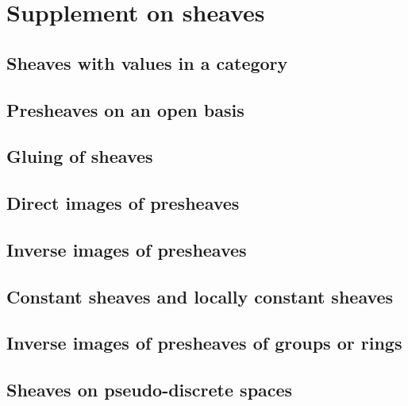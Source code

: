 \documentclass[10pt,oneside]{amsart}
\begin{document}
    \section{Supplement on sheaves}

        \subsection{Sheaves with values in a category}
        

        \subsection{Presheaves on an open basis}
        

        \subsection{Gluing of sheaves}
        

        \subsection{Direct images of presheaves}
        

        \subsection{Inverse images of presheaves}
        

        \subsection{Constant sheaves and locally constant sheaves}
        

        \subsection{Inverse images of presheaves of groups or rings}
        

        \subsection{Sheaves on pseudo-discrete spaces}
        
\end{document}
